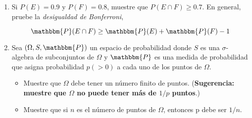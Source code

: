 \documentclass[a4paper]{article}
\begin{document}
\begin{enumerate}
\item Si $P(E) = 0.9$ y $P(F) = 0.8$, muestre que $P(E \cap F ) \ge 0.7.$ En general, pruebe la \textit{desigualdad de Bonferroni}, 

$$ \mathbbm{P}(E \cap F) \ge \mathbbm{P}(E) + \mathbbm{P}(F) - 1$$

\item  Sea $(\Omega, S,\mathbbm{P})$ un espacio de probabilidad donde $S$ es una $\sigma$-algebra de subconjuntos de $\Omega$ y $\mathbbm{P}$ es una medida de probabilidad que asigna probabilidad $p(> 0)$ a cada uno de los puntos de $\Omega$.

\begin{itemize}
    \item Muestre que $\Omega$ debe tener un número finito de puntos. (\textbf{Sugerencia: muestre que $\Omega$ no puede tener más de $1/p$ puntos}.)
    \item Muestre que si $n$ es el número de puntos de $\Omega$, entonces p debe ser $1/n$.
\end{itemize}
\end{enumerate}
\newpage
\end{document}
